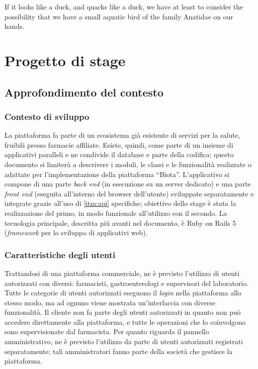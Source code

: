 
\begin{savequote}[75mm]
    If it looks like a duck, and quacks like a duck, we have at least to consider the possibility that we have a small aquatic bird of the family Anatidae on our hands.
\end{savequote}
\chapter{Progetto di stage}
\label{chap2}
\section{Approfondimento del contesto}
\subsection{Contesto di sviluppo}
\label{sec:devctx}
La piattaforma fa parte di un ecosistema già esistente di servizi per la salute, fruibili presso farmacie affiliate. Esiste, quindi, come parte di un insieme di applicativi paralleli e ne condivide il database e parte della codifica: questo documento si limiterà a descrivere i moduli, le classi e le funzionalità realizzate o adattate per l'implementazione della piattaforma ``Biota''.
L'applicativo si compone di una parte \textit{back end} (in esecuzione su un server dedicato) e una parte \textit{front end} (eseguita all'interno del browser dell'utente) sviluppate separatamente e integrate grazie all'uso di \ref{itm:api} specifiche; obiettivo dello stage è stata la realizzazione del primo, in modo funzionale all'utilizzo con il secondo. La tecnologia principale, descritta più avanti nel documento, è Ruby on Rails 5 (\textit{framework} per lo sviluppo di applicativi web).

\subsection{Caratteristiche degli utenti}
Trattandosi di una piattaforma commerciale, ne è previsto l'utilizzo di utenti autorizzati con diversi: farmacisti, gastroenterologi e supervisori del laboratorio. Tutte le categorie di utenti autorizzati eseguono il \textit{login} nella piattaforma allo stesso modo, ma ad ognuno viene mostrata un'interfaccia con diverse funzionalità. Il cliente non fa parte degli utenti autorizzati in quanto non può accedere direttamente alla piattaforma, e tutte le operazioni che lo coinvolgono sono supervisionate dal farmacista.
Per quanto riguarda il pannello amministrativo, ne è previsto l'utilizzo da parte di utenti autorizzati registrati separatamente; tali amministratori fanno parte della società che gestisce la piattaforma.

